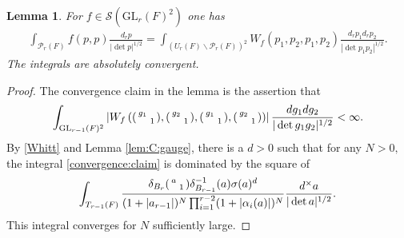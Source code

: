\documentclass[12pt]{amsart}
\newtheorem{lem}[thm]{Lemma}
\theoremstyle{remark}
\numberwithin{equation}{section}
\newcommand{\GL}{\mathrm{GL}}
\theoremstyle{definition}
\newenvironment{psmatrix}
  {\left(\begin{smallmatrix}}
  {\end{smallmatrix}\right)}
\numberwithin{equation}{subsection}
\begin{document}
\begin{lem} \label{lem:RS}
For $f \in \mathcal{S}(\GL_{r}(F)^2)$ one has
\begin{align*}
    \int_{\mathcal{P}_{r}(F)}f(p,p)\frac{d_r p}{|\det p|^{1/2}}=\int_{(U_r(F) \backslash \mathcal{P}_{r}(F))^2}W_{f}(p_1,p_2,p_1,p_2)\frac{d_rp_1d_rp_2}{|\det p_1p_2|^{1/2}}.
\end{align*}
The integrals are absolutely convergent.
\end{lem}

\begin{proof}
The convergence claim in the lemma is the assertion that 
\begin{align} \label{convergence:claim}
\int_{\GL_{r-1}(F)^2}\left|W_{f}\left(\begin{psmatrix} g_1 & \\ & 1 \end{psmatrix},\begin{psmatrix} g_2 & \\ & 1 \end{psmatrix},\begin{psmatrix} g_1 & \\ & 1 \end{psmatrix},\begin{psmatrix} g_2 & \\ & 1 \end{psmatrix}\right)\right|\frac{dg_1dg_2}{|\det g_1g_2|^{1/2}}<\infty.
\end{align}
By \eqref{Whitt} and Lemma \ref{lem:C:gauge}, there is a $d>0$ such that for any $N>0,$ the integral \eqref{convergence:claim} is dominated by the square of
\begin{align*}
\int_{T_{r-1}(F)} \frac{\delta_{B_r}\begin{psmatrix} a & \\
 & 1 \end{psmatrix}\delta_{B_{r-1}}^{-1}(a) \sigma(a)^d}{(1+|a_{r-1}|)^{N}\prod_{i=1}^{r-2}(1+|\alpha_i(a)|)^{N}} \frac{d^\times a}{|\det a|^{1/2}}.
\end{align*}
 This integral converges for $N$ sufficiently large.


\end{proof}
\end{document}
